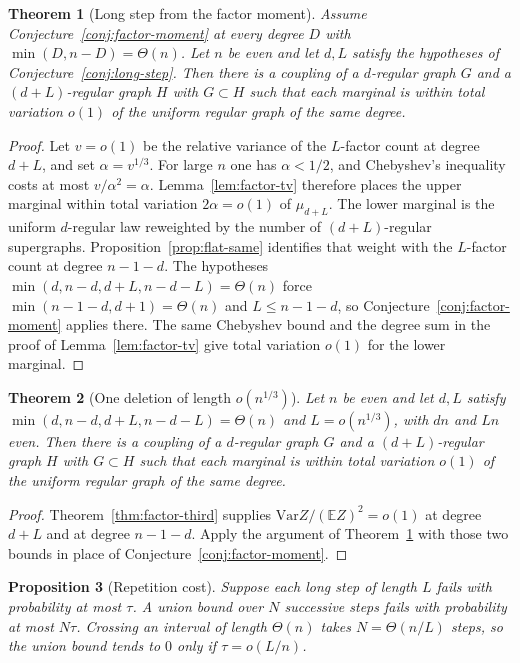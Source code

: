 \documentclass[11pt]{article}
\newtheorem{theorem}{Theorem}
\newtheorem{proposition}[theorem]{Proposition}
\newcommand{\EE}{\mathbb{E}}
\newcommand{\Var}{\mathrm{Var}}
\begin{document}
\begin{theorem}[Long step from the factor moment]
\label{thm:long-from-moment}
Assume Conjecture~\ref{conj:factor-moment} at every degree \(D\) with \(\min(D,n-D)=\Theta(n)\).
Let \(n\) be even and let \(d,L\) satisfy the hypotheses of Conjecture~\ref{conj:long-step}.
Then there is a coupling of a \(d\)-regular graph \(G\) and a \((d+L)\)-regular graph \(H\) with \(G\subset H\) such that each marginal is within total variation \(o(1)\) of the uniform regular graph of the same degree.
\end{theorem}

\begin{proof}
Let \(v=o(1)\) be the relative variance of the \(L\)-factor count at degree \(d+L\), and set \(\alpha=v^{1/3}\).
For large \(n\) one has \(\alpha<1/2\), and Chebyshev's inequality costs at most \(v/\alpha^2=\alpha\).
Lemma~\ref{lem:factor-tv} therefore places the upper marginal within total variation \(2\alpha=o(1)\) of \(\mu_{d+L}\).
The lower marginal is the uniform \(d\)-regular law reweighted by the number of \((d+L)\)-regular supergraphs.
Proposition~\ref{prop:flat-same} identifies that weight with the \(L\)-factor count at degree \(n-1-d\).
The hypotheses \(\min(d,n-d,d+L,n-d-L)=\Theta(n)\) force \(\min(n-1-d,d+1)=\Theta(n)\) and \(L\le n-1-d\), so Conjecture~\ref{conj:factor-moment} applies there.
The same Chebyshev bound and the degree sum in the proof of Lemma~\ref{lem:factor-tv} give total variation \(o(1)\) for the lower marginal.
\end{proof}

\begin{theorem}[One deletion of length \(o(n^{1/3})\)]
\label{thm:third-step}
Let \(n\) be even and let \(d,L\) satisfy \(\min(d,n-d,d+L,n-d-L)=\Theta(n)\) and \(L=o(n^{1/3})\), with \(dn\) and \(Ln\) even.
Then there is a coupling of a \(d\)-regular graph \(G\) and a \((d+L)\)-regular graph \(H\) with \(G\subset H\) such that each marginal is within total variation \(o(1)\) of the uniform regular graph of the same degree.
\end{theorem}

\begin{proof}
Theorem~\ref{thm:factor-third} supplies \(\Var Z/(\EE Z)^2=o(1)\) at degree \(d+L\) and at degree \(n-1-d\).
Apply the argument of Theorem~\ref{thm:long-from-moment} with those two bounds in place of Conjecture~\ref{conj:factor-moment}.
\end{proof}

\begin{proposition}[Repetition cost]
\label{prop:repeat-cost}
Suppose each long step of length \(L\) fails with probability at most \(\tau\).
A union bound over \(N\) successive steps fails with probability at most \(N\tau\).
Crossing an interval of length \(\Theta(n)\) takes \(N=\Theta(n/L)\) steps, so the union bound tends to \(0\) only if \(\tau=o(L/n)\).
\end{proposition}
\end{document}
